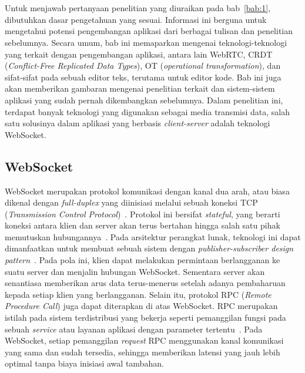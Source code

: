 \chapter{\babDua}
\label{bab:2}
Untuk menjawab pertanyaan penelitian yang diuraikan pada bab~\ref{bab:1}, dibutuhkan dasar pengetahuan yang sesuai. Informasi ini berguna untuk mengetahui potensi pengembangan aplikasi dari berbagai tulisan dan penelitian sebelumnya. Secara umum, bab ini memaparkan mengenai teknologi-teknologi yang terkait dengan pengembangan aplikasi, antara lain WebRTC, CRDT (\textit{Conflict-Free Replicated Data Types}), OT (\textit{operational transformation}), dan sifat-sifat pada sebuah editor teks, terutama untuk editor kode. Bab ini juga akan memberikan gambaran mengenai penelitian terkait dan sistem-sistem aplikasi yang sudah pernah dikembangkan sebelumnya. Dalam penelitian ini, terdapat banyak teknologi yang digunakan sebagai media transmisi data, salah satu solusinya dalam aplikasi yang berbasis \textit{client-server} adalah teknologi WebSocket.

\section{WebSocket}

WebSocket merupakan protokol komunikasi dengan kanal dua arah, atau biasa dikenal dengan \textit{full-duplex} yang diinisiasi melalui sebuah koneksi TCP (\textit{Transmission Control Protocol})~\citep{fette2011websocket}. Protokol ini bersifat \textit{stateful}, yang berarti koneksi antara klien dan server akan terus bertahan hingga salah satu pihak memutuskan hubungannya~\citep{pimentel2012communicating}. Pada arsitektur perangkat lunak, teknologi ini dapat dimanfaatkan untuk membuat sebuah sistem dengan \textit{publisher-subscriber design pattern}~\citep{ganaputra2015asynchronous}. Pada pola ini, klien dapat melakukan permintaan berlangganan ke suatu server dan menjalin hubungan WebSocket. Sementara server akan senantiasa memberikan arus data terus-menerus setelah adanya pembaharuan kepada setiap klien yang berlangganan. Selain itu, protokol RPC (\textit{Remote Procedure Call}) juga dapat diterapkan di atas WebSocket. RPC merupakan istilah pada sistem terdistribusi yang bekerja seperti pemanggilan fungsi pada sebuah \textit{service} atau layanan aplikasi dengan parameter tertentu~\citep{srinivasan1995rpc}. Pada WebSocket, setiap pemanggilan \textit{request} RPC menggunakan kanal komunikasi yang sama dan sudah tersedia, sehingga memberikan latensi yang jauh lebih optimal tanpa biaya inisiasi awal tambahan.

